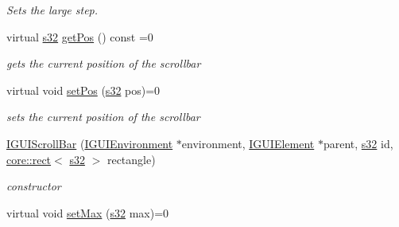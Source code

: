 \begin{DoxyCompactItemize}
\begin{DoxyCompactList}\small\item\em Sets the large step. \end{DoxyCompactList}\item 
\mbox{\label{classirr_1_1gui_1_1IGUIScrollBar_ad11122ee5eafc429c4e1b7710514f90b}} 
virtual \hyperlink{namespaceirr_ac66849b7a6ed16e30ebede579f9b47c6}{s32} \hyperlink{classirr_1_1gui_1_1IGUIScrollBar_ad11122ee5eafc429c4e1b7710514f90b}{get\+Pos} () const =0
\begin{DoxyCompactList}\small\item\em gets the current position of the scrollbar \end{DoxyCompactList}\item 
\mbox{\label{classirr_1_1gui_1_1IGUIScrollBar_a62609bf3b076a16afeb6e67072a8ea13}} 
virtual void \hyperlink{classirr_1_1gui_1_1IGUIScrollBar_a62609bf3b076a16afeb6e67072a8ea13}{set\+Pos} (\hyperlink{namespaceirr_ac66849b7a6ed16e30ebede579f9b47c6}{s32} pos)=0
\begin{DoxyCompactList}\small\item\em sets the current position of the scrollbar \end{DoxyCompactList}\item 
\mbox{\label{classirr_1_1gui_1_1IGUIScrollBar_a350c657e1cd95ddb566570e7759ff886}} 
\hyperlink{classirr_1_1gui_1_1IGUIScrollBar_a350c657e1cd95ddb566570e7759ff886}{I\+G\+U\+I\+Scroll\+Bar} (\hyperlink{classirr_1_1gui_1_1IGUIEnvironment}{I\+G\+U\+I\+Environment} $\ast$environment, \hyperlink{classirr_1_1gui_1_1IGUIElement}{I\+G\+U\+I\+Element} $\ast$parent, \hyperlink{namespaceirr_ac66849b7a6ed16e30ebede579f9b47c6}{s32} id, \hyperlink{classirr_1_1core_1_1rect}{core\+::rect}$<$ \hyperlink{namespaceirr_ac66849b7a6ed16e30ebede579f9b47c6}{s32} $>$ rectangle)
\begin{DoxyCompactList}\small\item\em constructor \end{DoxyCompactList}\item 
\mbox{\label{classirr_1_1gui_1_1IGUIScrollBar_a0d07ab631a8aa6e8edbdfa65250cd556}} 
virtual void \hyperlink{classirr_1_1gui_1_1IGUIScrollBar_a0d07ab631a8aa6e8edbdfa65250cd556}{set\+Max} (\hyperlink{namespaceirr_ac66849b7a6ed16e30ebede579f9b47c6}{s32} max)=0

\end{DoxyCompactItemize}
